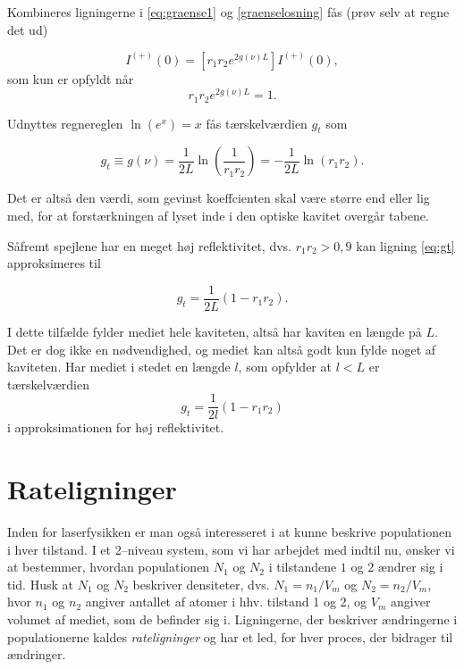Kombineres ligningerne i \ref{eq:graense1} og \ref{graenselosning} fås (prøv selv at regne det ud)

\begin{equation}
I^{(+)}(0) = \left[ r_1r_2e^{2g(\nu)L}\right]I^{(+)}(0),
\end{equation}
som kun er opfyldt når 
\begin{equation}
r_1r_2e^{2g(\nu)L}=1. 
\end{equation}

Udnyttes regnereglen $\ln\left(e^x\right) = x$ fås tærskelværdien $g_t$ som

\begin{equation}
g_t \equiv g(\nu) = \frac{1}{2L}\ln\left(\frac{1}{r_1r_2}\right) = -\frac{1}{2L}\ln(r_1r_2). 
\label{eq:gt}
\end{equation}

Det er altså den værdi, som gevinst koeffcienten skal være større end eller lig med, for at forstærkningen af lyset inde i den optiske kavitet overgår tabene.

Såfremt spejlene har en meget høj reflektivitet, dvs. $r_1r_2>0,9$ kan ligning \ref{eq:gt} approksimeres til 

\begin{equation}
g_t = \frac{1}{2L}(1-r_1r_2).
\end{equation}

I dette tilfælde fylder mediet hele kaviteten, altså har kaviten en længde på $L$. Det er dog ikke en nødvendighed, og mediet kan altså godt kun fylde noget af kaviteten. Har mediet i stedet en længde $l$, som opfylder at $l<L$ er tærskelværdien 
\begin{equation}
g_t = \frac{1}{2l}(1-r_1r_2)
\end{equation}
i approksimationen for høj reflektivitet. 

\section{Rateligninger}
Inden for laserfysikken er man også interesseret i at kunne beskrive populationen i hver tilstand. I et 2--niveau system, som vi har arbejdet med indtil nu, ønsker vi at bestemmer, hvordan populationen $N_1$ og $N_2$ i tilstandene $1$ og $2$ ændrer sig i tid. Husk at $N_1$ og $N_2$ beskriver densiteter, dvs. $N_1 = n_1/V_m$ og $N_2 = n_2/V_m$, hvor $n_1$ og $n_2$ angiver antallet af atomer i hhv. tilstand 1 og 2, og $V_m$ angiver volumet af mediet, som de befinder sig i. 
Ligningerne, der beskriver ændringerne i populationerne kaldes \emph{rateligninger} og har et led, for hver proces, der bidrager til ændringer. 

